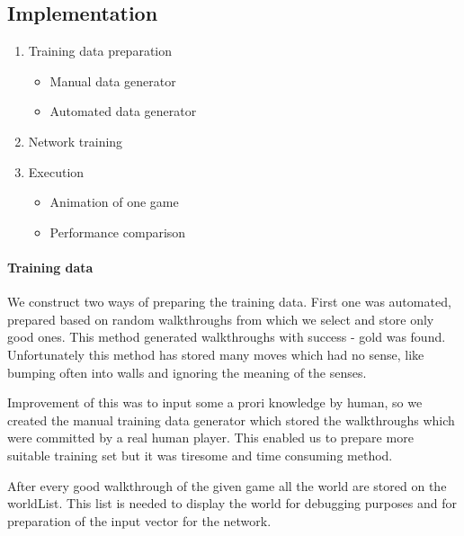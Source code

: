 \documentclass[a4paper]{article}
\begin{document}
\subsection{Implementation }
		\begin{enumerate}
		\item Training data preparation
			\begin{itemize}
				\item Manual data generator 
				\item Automated data generator
			\end{itemize}
		\item Network training 
		\item Execution
			\begin{itemize}
				\item Animation of one game
				\item Performance comparison 
			\end{itemize}
	\end{enumerate}
	
	\paragraph{Training data}
	We construct two ways of preparing the training data. First one was automated, prepared 
	based on random walkthroughs from which we select and store only good ones. This method
	 generated walkthroughs with success - gold was found. Unfortunately this method has stored 
	 many moves which had no sense, like bumping often into walls and ignoring the meaning 
	 of the senses.  
	 
	 Improvement of this was to input some a prori knowledge by human, so we created the manual
	 training data generator which stored the walkthroughs which were committed by a real human player.
	 This enabled us to prepare more suitable training set but it was tiresome and time consuming method.
	 
	After every good walkthrough of the given game all the world are stored on the worldList. This list is needed to display the world for debugging purposes and for preparation of the input vector for the network.
	 
	 
\end{document}
